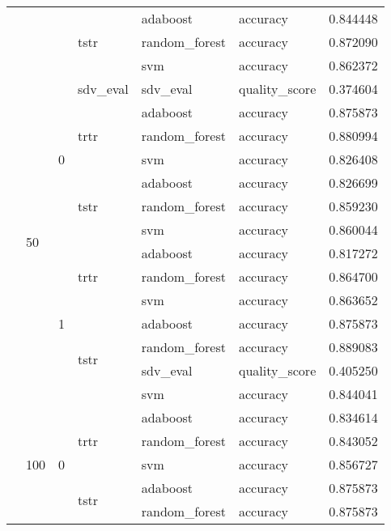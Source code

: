 \begin{longtable}{llllllr}
\cline{4-7} \cline{5-7}
 &  &  & \multirow[t]{3}{*}{tstr} & adaboost & accuracy & 0.844448 \\
\cline{5-7}
 &  &  &  & random_forest & accuracy & 0.872090 \\
\cline{5-7}
 &  &  &  & svm & accuracy & 0.862372 \\
\cline{2-7} \cline{3-7} \cline{4-7} \cline{5-7}
 & \multirow[t]{14}{*}{50} & \multirow[t]{7}{*}{0} & sdv_eval & sdv_eval & quality_score & 0.374604 \\
\cline{4-7} \cline{5-7}
 &  &  & \multirow[t]{3}{*}{trtr} & adaboost & accuracy & 0.875873 \\
\cline{5-7}
 &  &  &  & random_forest & accuracy & 0.880994 \\
\cline{5-7}
 &  &  &  & svm & accuracy & 0.826408 \\
\cline{4-7} \cline{5-7}
 &  &  & \multirow[t]{3}{*}{tstr} & adaboost & accuracy & 0.826699 \\
\cline{5-7}
 &  &  &  & random_forest & accuracy & 0.859230 \\
\cline{5-7}
 &  &  &  & svm & accuracy & 0.860044 \\
\cline{3-7} \cline{4-7} \cline{5-7}
 &  & \multirow[t]{7}{*}{1} & \multirow[t]{3}{*}{trtr} & adaboost & accuracy & 0.817272 \\
\cline{5-7}
 &  &  &  & random_forest & accuracy & 0.864700 \\
\cline{5-7}
 &  &  &  & svm & accuracy & 0.863652 \\
\cline{4-7} \cline{5-7}
 &  &  & \multirow[t]{4}{*}{tstr} & adaboost & accuracy & 0.875873 \\
\cline{5-7}
 &  &  &  & random_forest & accuracy & 0.889083 \\
\cline{5-7}
 &  &  &  & sdv_eval & quality_score & 0.405250 \\
\cline{5-7}
 &  &  &  & svm & accuracy & 0.844041 \\
\cline{2-7} \cline{3-7} \cline{4-7} \cline{5-7}
 & \multirow[t]{14}{*}{100} & \multirow[t]{7}{*}{0} & \multirow[t]{3}{*}{trtr} & adaboost & accuracy & 0.834614 \\
\cline{5-7}
 &  &  &  & random_forest & accuracy & 0.843052 \\
\cline{5-7}
 &  &  &  & svm & accuracy & 0.856727 \\
\cline{4-7} \cline{5-7}
 &  &  & \multirow[t]{4}{*}{tstr} & adaboost & accuracy & 0.875873 \\
\cline{5-7}
 &  &  &  & random_forest & accuracy & 0.875873 \\

\end{longtable}
